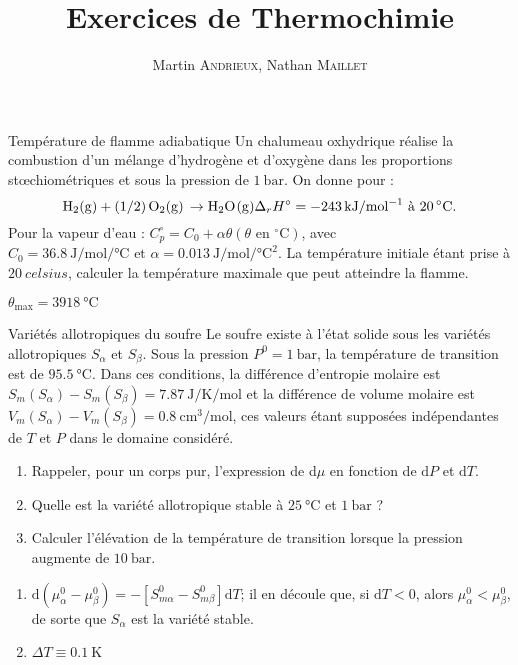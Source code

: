 \documentclass[french, a4paper, 11pt]{article}
\title{Exercices de Thermochimie}
\author{Martin \textsc{Andrieux}, Nathan \textsc{Maillet}}
\date{}
\begin{document}
\maketitle

\begin{cadre}{Température de flamme adiabatique}
  Un chalumeau oxhydrique réalise la combustion d'un mélange d'hydrogène et d'oxygène dans les
  proportions st\oe{}chiométriques et sous la pression de \(\SI{1}{\bar}\). On donne pour :
    \[\ce{H2(g) + (1/2)O2(g) \rightarrow H2O(g)} \Delta_rH^{\circ}=\SI{-243}{\kilo\joule\per\mole^{-1}} \text{ à } \SI{20}{\celsius}.\]
  Pour la vapeur d'eau : \(C_p^{\circ}=C_0+\alpha \theta (\theta \text{ en } ^{\circ} \text{C})\), avec \(C_0=\SI{36.8}{\joule\per\mole\per\celsius} \text{ et }
  \alpha=\SI{0.013}{\joule\per\mole\per\celsius\squared}.\) La température initiale étant prise à \(\SI{20}{celsius}\), calculer la température maximale que peut atteindre la flamme.
  
  \tcblower
  \(\theta_{\text{max}}=\SI{3 918}{\celsius}\)
\end{cadre}

\begin{cadre}{Variétés allotropiques du soufre}
  Le soufre existe à l'état solide sous les variétés allotropiques \(S_{\alpha}\) et \(S_{\beta}\). Sous la pression \(P^0=\SI{1}{\bar}\),
  la température de transition est de \(\SI{95.5}{\celsius}\). Dans ces conditions, la différence d'entropie molaire est
  \({S_m(S_{\alpha})-S_m(S_{\beta})=\SI{7.87}{\joule\per\kelvin\per\mole}}\) et la différence de volume molaire est
  \({V_m(S_{\alpha})-V_m(S_{\beta})=\SI{0.8}{\centi\metre\cubed\per\mole}}\), ces valeurs étant supposées indépendantes de \(T\) et \(P\) dans le domaine considéré.
  \begin{enumerate}
    \item Rappeler, pour un corps pur, l'expression de d$\mu$ en fonction de $\mathrm{d}P$ et $\mathrm{d}T$.
    \item Quelle est la variété allotropique stable à \(\SI{25}{\celsius}\) et \(\SI{1}{\bar}\) ?
    \item Calculer l'élévation de la température de transition lorsque la pression augmente de \(\SI{10}{\bar}\).
  \end{enumerate}
  
  \tcblower
  \begin{enumerate}
    \item \(\mathrm{d}(\mu_{\alpha}^0-\mu_{\beta}^0)=-[S_{m\alpha}^0-S_{m\beta}^0]\mathrm{d}T\); il en découle que,
    si \(\mathrm{d}T < 0\), alors \(\mu_{\alpha}^0<\mu_{\beta}^0\), de sorte que \(S_{\alpha}\) est la variété stable.
    \item \(\Delta T \equiv \SI{0.1}{\kelvin}\)
  \end{enumerate}    
\end{cadre}
\end{document}
